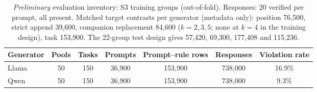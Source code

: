 \begin{table}[h]
\centering\footnotesize
\caption{\emph{Preliminary} evaluation inventory: S3 training groups (out-of-fold). Responses: 20 verified per prompt, all present. Matched target contrasts per generator (metadata only): position 76,500, strict append 39,600, companion replacement 84,600 ($k=2,3,5$; none at $k=4$ in the training design), task 153,900. The 22-group test design gives 57,420, 69,300, 177,408 and 115,236.}
\label{tab:inventory}
\begin{tabular}{lcccccc}
\toprule
Generator & Pools & Tasks & Prompts & Prompt--rule rows & Responses & Violation rate \\
\midrule
Llama & 50 & 150 & 36,900 & 153,900 & 738,000 & 16.9\% \\
Qwen & 50 & 150 & 36,900 & 153,900 & 738,000 & 9.3\% \\
\bottomrule
\end{tabular}
\end{table}

